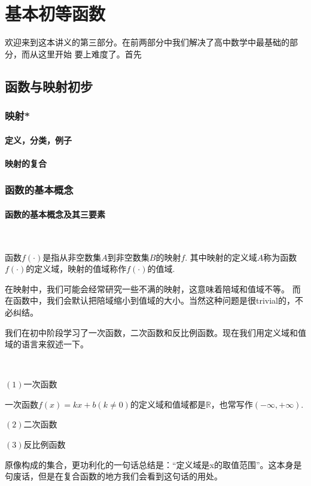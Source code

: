 \part{基本初等函数}
欢迎来到这本讲义的第三部分。在前两部分中我们解决了高中数学中最基础的部分，而从这里开始
要上难度了。首先 
\chapter{函数与映射初步}
\section{映射*}
\subsection{定义，分类，例子}
\subsection{映射的复合}

\clearpage
\section{函数的基本概念}
\subsection{函数的基本概念及其三要素}

\begin{definition}[函数，定义域，值域]
    \ 

    函数$f(\cdot)$是指从非空数集$A$到非空数集$B$的映射$f$.
    其中映射的定义域$A$称为函数$f(\cdot)$的定义域，映射的值域称作$f(\cdot)$的值域.
\end{definition}
\begin{zhu}
    在映射中，我们可能会经常研究一些不满的映射，这意味着陪域和值域不等。
    而在函数中，我们会默认把陪域缩小到值域的大小。当然这种问题是很trivial的，不必纠结。
\end{zhu}
我们在初中阶段学习了一次函数，二次函数和反比例函数。现在我们用定义域和值域的语言来叙述一下。
\begin{example}
    \ 

    $(1)$一次函数

    一次函数$f(x)=kx+b(k\neq0)$的定义域和值域都是$\mathbb{R}$，也常写作$(-\infty,+\infty)$.
    
    $(2)$二次函数

    $(3)$反比例函数
\end{example}
原像构成的集合，更功利化的一句话总结是：“定义域是x的取值范围”。这本身是句废话，但是在复合函数的地方我们会看到这句话的用处。

